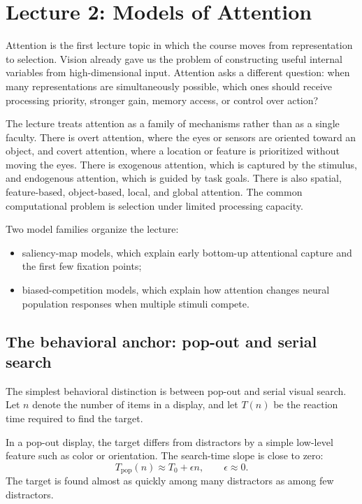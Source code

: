 \section{Lecture 2: Models of Attention}

Attention is the first lecture topic in which the course moves from representation to selection. Vision already gave us the problem of constructing useful internal variables from high-dimensional input. Attention asks a different question: when many representations are simultaneously possible, which ones should receive processing priority, stronger gain, memory access, or control over action?

The lecture treats attention as a family of mechanisms rather than as a single faculty. There is overt attention, where the eyes or sensors are oriented toward an object, and covert attention, where a location or feature is prioritized without moving the eyes. There is exogenous attention, which is captured by the stimulus, and endogenous attention, which is guided by task goals. There is also spatial, feature-based, object-based, local, and global attention. The common computational problem is selection under limited processing capacity.

Two model families organize the lecture:
\begin{itemize}
    \item saliency-map models, which explain early bottom-up attentional capture and the first few fixation points;
    \item biased-competition models, which explain how attention changes neural population responses when multiple stimuli compete.
\end{itemize}

\subsection{The behavioral anchor: pop-out and serial search}

The simplest behavioral distinction is between pop-out and serial visual search. Let \(n\) denote the number of items in a display, and let \(T(n)\) be the reaction time required to find the target.

In a pop-out display, the target differs from distractors by a simple low-level feature such as color or orientation. The search-time slope is close to zero:
\[
T_{\mathrm{pop}}(n) \approx T_0 + \epsilon n,
\qquad
\epsilon \approx 0.
\]
The target is found almost as quickly among many distractors as among few distractors.

